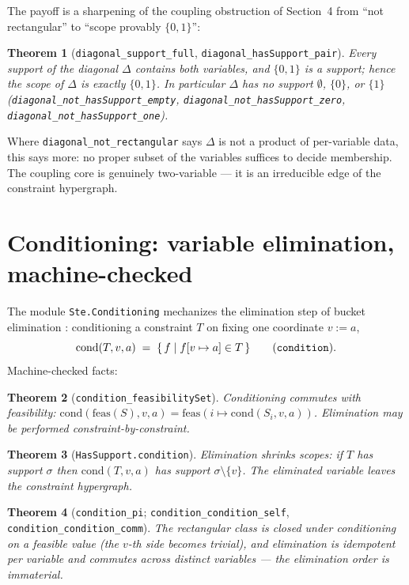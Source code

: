 \documentclass[11pt]{article}
\newtheorem{theorem}{Theorem}
\newcommand{\lean}[1]{\texttt{#1}}
\newcommand{\feas}{\mathrm{feas}}
\begin{document}
The payoff is a sharpening of the coupling obstruction of
Section~4 from ``not rectangular'' to ``scope provably $\{0,1\}$'':

\begin{theorem}[\lean{diagonal\_support\_full},
\lean{diagonal\_hasSupport\_pair}]
Every support of the diagonal $\Delta$ contains both variables, and
$\{0,1\}$ is a support; hence the scope of $\Delta$ is exactly
$\{0,1\}$.  In particular $\Delta$ has no support $\emptyset$,
$\{0\}$, or $\{1\}$
(\lean{diagonal\_not\_hasSupport\_empty},
\lean{diagonal\_not\_hasSupport\_zero},
\lean{diagonal\_not\_hasSupport\_one}).
\end{theorem}

Where \lean{diagonal\_not\_rectangular} says $\Delta$ is not a product
of per-variable data, this says more: no proper subset of the
variables suffices to decide membership.  The coupling core is
genuinely two-variable --- it is an irreducible edge of the constraint
hypergraph.

\section{Conditioning: variable elimination, machine-checked}

The module \lean{Ste.Conditioning} mechanizes the elimination step of
bucket elimination \citep{dechter2003constraint}: conditioning a
constraint $T$ on fixing one coordinate $v := a$,
\[
  \mathrm{cond}(T, v, a) \;=\;
  \{\, f \mid f[v \mapsto a] \in T \,\}
  \qquad (\text{\lean{condition}}).
\]
Machine-checked facts:

\begin{theorem}[\lean{condition\_feasibilitySet}]
Conditioning commutes with feasibility:
$\mathrm{cond}(\feas(S), v, a) = \feas(i \mapsto
\mathrm{cond}(S_i, v, a))$.  Elimination may be performed
constraint-by-constraint.
\end{theorem}

\begin{theorem}[\lean{HasSupport.condition}]
Elimination shrinks scopes: if $T$ has support $\sigma$ then
$\mathrm{cond}(T, v, a)$ has support $\sigma \setminus \{v\}$.  The
eliminated variable leaves the constraint hypergraph.
\end{theorem}

\begin{theorem}[\lean{condition\_pi};
\lean{condition\_condition\_self}, \lean{condition\_condition\_comm}]
The rectangular class is closed under conditioning on a feasible
value (the $v$-th side becomes trivial), and elimination is
idempotent per variable and commutes across distinct variables ---
the elimination order is immaterial.
\end{theorem}
\end{document}
